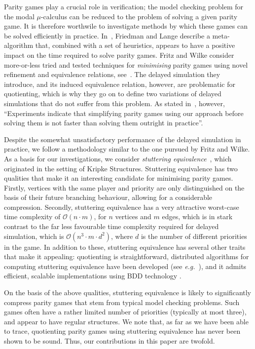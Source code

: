 \documentclass[a4paper]{llncs}
\newcommand{\eg}{\textit{e.g.}\xspace}
\begin{document}
Parity games play a crucial role in verification; the model checking
problem for the modal $\mu$-calculus can be reduced to the problem of
solving a given parity game. It is therefore worthwile to investigate
methods by which these games can be solved efficiently in practice.
In~\cite{FL:09}, Friedman and Lange describe a meta-algorithm that,
combined with a set of heuristics, appears to have a positive impact
on the time required to solve parity games.  Fritz and Wilke consider
more-or-less tried and tested techniques for \emph{minimising} parity
games using novel refinement and equivalence relations, see~\cite{FW:06}.
The delayed simulation they introduce, and its induced equivalence
relation, however, are problematic for quotienting, which is why they go
on to define two variations of delayed simulations that do not suffer
from this problem. As stated in~\cite{Wil:05}, however, ``Experiments
indicate that simplifying parity games using our approach before solving
them is not faster than solving them outright in practice''.

Despite the somewhat unsatisfactory performance of the delayed simulation
in practice, we follow a methodology similar to the one pursued by
Fritz and Wilke. As a basis for our investigations, we consider 
\emph{stuttering equivalence}~\cite{BCG:88}, which originated in the 
setting of Kripke Structures. Stuttering equivalence has two
qualities that make it an interesting candidate for minimising parity
games. Firstly, vertices with the same player and priority are only 
distinguished on the basis of their future branching behaviour,
allowing for a considerable compression. Secondly, stuttering equivalence
has a very attractive worst-case time complexity of $\mathcal{O}(n \cdot
m)$, for $n$ vertices and $m$ edges, which is in stark contrast to the
far less favourable time complexity required for delayed simulation,
which is $\mathcal{O}(n^3\cdot m \cdot d^2)$, where $d$ is the
number of different priorities in the game.  In addition to these,
stuttering equivalence has several other traits that make it appealing:
quotienting is straightforward, distributed algorithms for computing
stuttering equivalence have been developed (see \eg~\cite{BO:03}),
and it admits efficient, scalable implementations using BDD technology \cite{WHH+:06}.

On the basis of the above qualities, stuttering equivalence is likely to
significantly compress parity games that stem from typical model checking
problems.  Such games often have a rather limited number of priorities
(typically at most three), and appear to have regular structures. We note
that, as far as we have been able to trace, quotienting parity games
using stuttering equivalence has never been shown to be sound. Thus,
our contributions in this paper are twofold.
\end{document}
